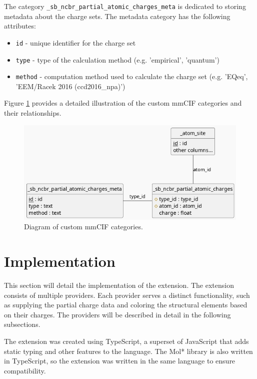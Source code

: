 \documentclass[
  digital,     %
  oneside,     %
  nosansbold,  %
  nocolorbold, %
  lof,         %
  lot,         %
]{fithesis4}
\begin{document}
The category \texttt{\_sb\_ncbr\_partial\_atomic\_charges\_meta} is dedicated to storing metadata about the charge sets. The metadata category has the following attributes:

\begin{itemize}
  \item \texttt{id} - unique identifier for the charge set
  \item \texttt{type} - type of the calculation method (e.g. 'empirical', 'quantum')
  \item \texttt{method} - computation method used to calculate the charge set (e.g. 'EQeq', 'EEM/Racek 2016 (ccd2016\_npa)')
\end{itemize}

Figure \ref{fig:mmcif_erd} provides a detailed illustration of the custom mmCIF categories and their relationships.

\begin{figure}
  \begin{center}
    \includegraphics[width=\textwidth]{figures/mmcif_erd.png}
  \end{center}
  \caption{Diagram of custom mmCIF categories.}
  \label{fig:mmcif_erd}
\end{figure}

\section{Implementation}
\label{section:implementation}

This section will detail the implementation of the extension. The extension consists of multiple providers. Each provider serves a distinct functionality, such as supplying the partial charge data and coloring the structural elements based on their charges. The providers will be described in detail in the following subsections.

The extension was created using TypeScript, a superset of JavaScript that adds static typing and other features to the language. The Mol* library is also written in TypeScript, so the extension was written in the same language to ensure compatibility.
\end{document}
